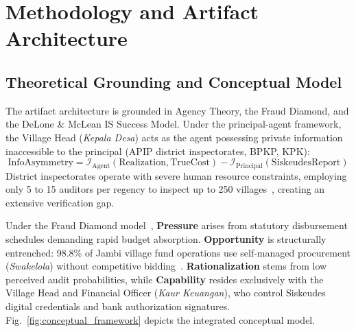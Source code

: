 \documentclass[conference]{IEEEtran}
\begin{document}
\section{Methodology and Artifact Architecture}

\subsection{Theoretical Grounding and Conceptual Model}

The artifact architecture is grounded in Agency Theory, the Fraud Diamond, and the DeLone \& McLean IS Success Model. Under the principal-agent framework, the Village Head (\textit{Kepala Desa}) acts as the agent possessing private information inaccessible to the principal (APIP district inspectorates, BPKP, KPK):
\begin{equation}
\mathrm{InfoAsymmetry} = \mathcal{I}_{\mathrm{Agent}}(\mathrm{Realization}, \mathrm{TrueCost}) - \mathcal{I}_{\mathrm{Principal}}(\mathrm{SiskeudesReport})
\end{equation}
District inspectorates operate with severe human resource constraints, employing only 5 to 15 auditors per regency to inspect up to 250 villages~\cite{ref12}, creating an extensive verification gap.

Under the Fraud Diamond model~\cite{ref17b}, \textbf{Pressure} arises from statutory disbursement schedules demanding rapid budget absorption. \textbf{Opportunity} is structurally entrenched: 98.8\% of Jambi village fund operations use self-managed procurement (\textit{Swakelola}) without competitive bidding~\cite{ref9}. \textbf{Rationalization} stems from low perceived audit probabilities, while \textbf{Capability} resides exclusively with the Village Head and Financial Officer (\textit{Kaur Keuangan}), who control Siskeudes digital credentials and bank authorization signatures. Fig.~\ref{fig:conceptual_framework} depicts the integrated conceptual model.
\end{document}
